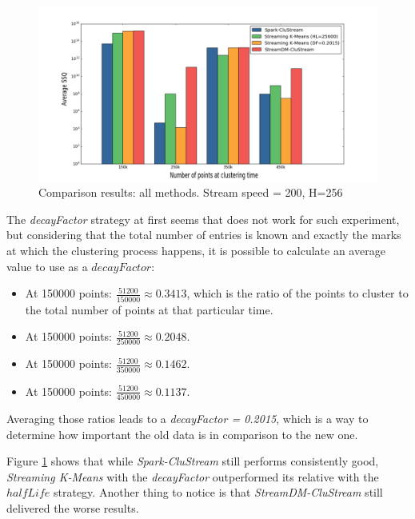 \documentclass{llncs}
\begin{document}
\begin{figure}[h!]
 \centering
 \includegraphics[scale=0.37]{./styles/comparison200.png}
 \caption{Comparison results: all methods. Stream speed = 200, H=256}
 \label{fig:comparison200}
\end{figure}

The \textit{decayFactor} strategy at first seems that does not work for such experiment, but considering that the total number of entries is known and exactly the marks at which the clustering process happens, it is possible to calculate an average value to use as a $decayFactor$: 

\begin{itemize}
 \item At 150000 points: $\frac{51200}{150000} \approx 0.3413$, which is the ratio of the points to cluster to the total number of points at that particular time.
 \item At 150000 points: $\frac{51200}{250000} \approx 0.2048$.
 \item At 150000 points: $\frac{51200}{350000} \approx 0.1462$.
 \item At 150000 points: $\frac{51200}{450000} \approx 0.1137$.
\end{itemize}

Averaging those ratios leads to a \textit{decayFactor = 0.2015}, which is a way to determine how important the old data is in comparison to the new one.


Figure \ref{fig:comparison200} shows that while \textit{Spark-CluStream} still performs consistently good, \textit{Streaming K-Means} with the \textit{decayFactor} outperformed its relative with the $halfLife$ strategy. Another thing to notice is that \textit{StreamDM-CluStream} still delivered the worse results. 
\end{document}

